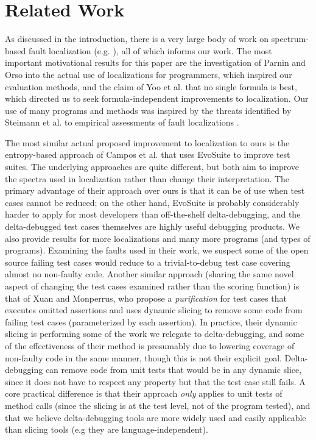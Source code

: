 \section{Related Work}

As discussed in the introduction, there is a very large body of work
on spectrum-based fault localization
(e.g. \cite{Tarantula,Ochai,AMPLE,Pinpoint,StatDebug,StatDebug2,EmpirReduce,Abreu:2006:PRDC,Santelices:ICSE:2009,Entropy,CCT}),
all of which informs our work.  The most important motivational
results for this paper are the investigation of Parnin and Orso
\cite{AutoHelp} into the actual use of localizations for programmers,
which inspired our evaluation methods, and the claim of Yoo et
al. \cite{yoo2014no} that no single formula is best, which directed us
to seek formula-independent improvements to localization.  Our use of
many programs and methods was inspired by the threats identified by
Steimann et al. to empirical assessments of fault localizations
\cite{Threats}. 

The most similar actual proposed improvement to localization to ours is the
entropy-based approach of Campos et al. \cite{Entropy} that uses
EvoSuite \cite{FA11} to improve test suites.  The underlying
approaches are quite different, but both aim to improve the spectra
used in localization rather than change their interpretation.  The
primary advantage of their approach over ours is that it can be of use
when test cases cannot be reduced; on the other hand, EvoSuite is
probably considerably harder to apply for most developers than
off-the-shelf delta-debugging, and the delta-debugged test cases
themselves are highly useful debugging products.  We also provide
results for more localizations and many more programs (and types of
programs).  Examining the faults used in their work, we suspect some
of the open source failing test cases would reduce to a
trivial-to-debug test case covering almost no non-faulty code.
Another similar approach (sharing the same novel aspect of changing
the test cases examined rather than the scoring function) is that of
Xuan and Monperrus, who propose a \emph{purification} for test cases
\cite{PureTest} that executes omitted assertions and uses dynamic
slicing \cite{DynamicSlicing} to remove some code from failing test
cases (parameterized by each assertion).  In practice, their dynamic
slicing is performing some of the work we relegate to delta-debugging,
and some of the effectiveness of their method is presumably due to
lowering coverage of non-faulty code in the same manner, though this
is not their explicit goal.  Delta-debugging can remove code from unit
tests that would be in any dynamic slice, since it does not have to
respect any property but that the test case still fails.  A core
practical difference is that their approach \emph{only} applies to
unit tests of method calls (since the slicing is at the test level,
not of the program tested), and that we believe delta-debugging tools
are more widely used and easily applicable than slicing tools (e.g
they are language-independent).

